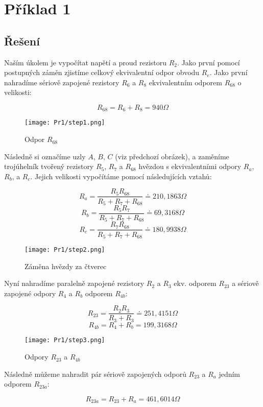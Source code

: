 \section{Příklad 1}

\subsection{Řešení}

Naším úkolem je vypočítat napětí a proud rezistoru $R_2$. Jako první pomocí postupných záměn 
zjistíme celkový ekvivalentní odpor obvodu $R_e$. Jako první nahradíme sériově zapojené 
rezistory $R_6$ a $R_8$ ekvivalentním odporem $R_{68}$ o velikosti:

$$ R_{68} = R_6 + R_8 = 940 \Omega$$

\begin{figure}[H]
\texttt{[image: Pr1/step1.png]}
\centering
\caption{Odpor $R_{68}$}
\end{figure}

Následně si označíme uzly $A$, $B$, $C$ (viz předchozí obrázek), a zaměníme trojúhelník tvořený rezistory $R_5$, $R_7$ a $R_{68}$ hvězdou s ekvivalentními odpory $R_a$, $R_b$, a $R_c$. Jejich velikosti vypočítáme pomocí následujících vztahů:

$$ R_a = \frac{R_5R_{68}}{R_5 + R_7 + R_{68}} \doteq 210,1863 \Omega$$
$$ R_b = \frac{R_5R_7}{R_5 + R_7 + R_{68}} \doteq 69,3168 \Omega$$
$$ R_c = \frac{R_7R_{68}}{R_5 + R_7 + R_{68}} \doteq 180,9938 \Omega$$

\begin{figure}[H]
\texttt{[image: Pr1/step2.png]}
\centering
\caption{Záměna hvězdy za čtverec}
\end{figure}

Nyní nahradíme paralelně zapojené rezistory $R_2$ a $R_3$ ekv. odporem $R_{23}$ a sériově zapojené odpory $R_4$ a $R_b$ odporem $R_{4b}$:

$$ R_{23} = \frac{R_2R_3}{R_3 + R_3} \doteq 251,4151 \Omega $$
$$ R_{4b} = R_4 + R_b = 199,3168 \Omega $$

\begin{figure}[H]
\texttt{[image: Pr1/step3.png]}
\centering
\caption{Odpory $R_{23}$ a $R_{4b}$}
\end{figure}

Následně můžeme nahradit pár sériově zapojených odporů $R_{23}$ a $R_a$ jedním odporem $R_{23a}$:

$$ R_{23a} = R_{23} + R_a = 461,6014 \Omega $$

